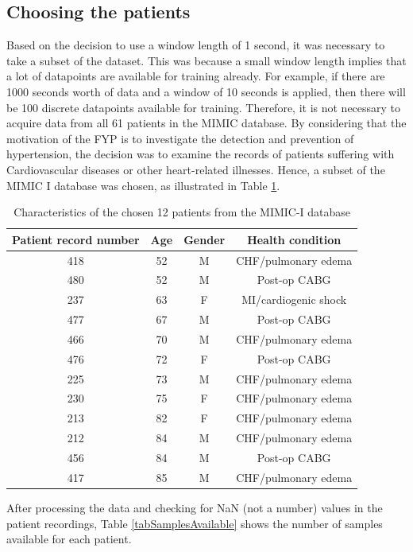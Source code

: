 \subsection{Choosing the patients}
Based on the decision to use a window length of 1 second, it was necessary to take a subset of the dataset.  
This was because a small window length implies that a lot of datapoints are available for training already. For example, if there are 1000 seconds worth of data and a window of 10 seconds is applied, then there will be 100 discrete datapoints available for training. Therefore, it is not necessary to acquire data from all 61 patients in the MIMIC database. By considering that the motivation of the FYP is to investigate the detection and prevention 
of hypertension, the decision was to examine the records of patients suffering with 
Cardiovascular diseases or other heart-related illnesses. Hence, a subset of the MIMIC I database was chosen, as illustrated 
in Table \ref{tabDatasetChosen}.
\begin{table}[H]
    \centering
    \caption{Characteristics of the chosen 12 patients from the MIMIC-I database}
    \label{tabDatasetChosen}
    \begin{tabular}{cccc}
    \hline
    \textbf{Patient record number} & \textbf{Age} & \textbf{Gender} & \textbf{Health condition} \\ \hline
    418 & 52 & M & CHF/pulmonary edema  \\
    480 & 52 & M & Post-op CABG         \\
    237 & 63 & F & MI/cardiogenic shock \\
    477 & 67 & M & Post-op CABG         \\
    466 & 70 & M & CHF/pulmonary edema  \\
    476 & 72 & F & Post-op CABG         \\
    225 & 73 & M & CHF/pulmonary edema  \\
    230 & 75 & F & CHF/pulmonary edema  \\
    213 & 82 & F & CHF/pulmonary edema  \\
    212 & 84 & M & CHF/pulmonary edema  \\
    456 & 84 & M & Post-op CABG         \\ 
    417 & 85 & M & CHF/pulmonary edema \\\hline
    \end{tabular}
\end{table}\noindent After processing the data and checking for NaN (not a number) values in the patient recordings, Table \ref{tabSamplesAvailable} 
shows the number of samples available for each patient.

